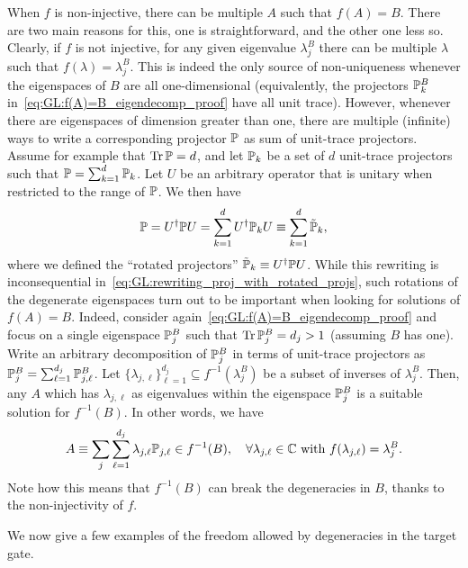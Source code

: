 When $f$ is non-injective, there can be multiple $A$ such that $f(A)=B$. There are two main reasons for this, one is straightforward, and the other one less so.
Clearly, if $f$ is not injective, for any given eigenvalue $\lambda_j^B$ there can be multiple $\lambda$ such that $f(\lambda)=\lambda_j^B$. This is indeed the only source of non-uniqueness whenever the eigenspaces of $B$ are all one-dimensional (equivalently, the projectors ${\mathbb{P}}_k^B$ in~\cref{eq:GL:f(A)=B_eigendecomp_proof} have all unit trace).
However, whenever there are eigenspaces of dimension greater than one, there are multiple (infinite) ways to write a corresponding projector ${\mathbb{P}}$ as sum of unit-trace projectors. Assume for example that $\Tr\PP=d$, and let ${\mathbb{P}}_k$ be a set of $d$ unit-trace projectors such that ${\mathbb{P}}=\sum_{k=1}^d {\mathbb{P}}_k$. Let $U$ be an arbitrary operator that is unitary when restricted to the range of ${\mathbb{P}}$.
We then have
\begin{equation}
    {\mathbb{P}}=U^\dagger {\mathbb{P}} U =\sum_{k=1}^d U^\dagger {\mathbb{P}}_k U
    \equiv \sum_{k=1}^d \tilde{{\mathbb{P}}}_k,
    \label{eq:GL:rewriting_proj_with_rotated_projs}
\end{equation}
where we defined the ``rotated projectors'' $\tilde{{\mathbb{P}}}_k\equiv U^\dagger {\mathbb{P}} U$.
While this rewriting is inconsequential in~\cref{eq:GL:rewriting_proj_with_rotated_projs}, such rotations of the degenerate eigenspaces turn out to be important when looking for solutions of $f(A)=B$.
Indeed, consider again~\cref{eq:GL:f(A)=B_eigendecomp_proof} and focus on a single eigenspace ${\mathbb{P}}_j^B$ such that $\Tr\PP_j^B=d_j>1$ (assuming $B$ has one). Write an arbitrary decomposition of ${\mathbb{P}}_j^B$ in terms of unit-trace projectors as ${\mathbb{P}}_j^B=\sum_{\ell=1}^{d_j}{\mathbb{P}}^B_{j,\ell}$.
Let $\{\lambda_{j,\ell}\}_{\ell=1}^{d_j}\subseteq f^{-1}(\lambda_j^B)$ be a subset of inverses of $\lambda_j^B$. Then, any $A$ which has $\lambda_{j,\ell}$ as eigenvalues within the eigenspace ${\mathbb{P}}_j^B$ is a suitable solution for $f^{-1}(B)$.
In other words, we have
\begin{equation}
    A \equiv \sum_j \sum_{\ell=1}^{d_j} \lambda_{j,\ell} {\mathbb{P}}_{j,\ell}\in f^{-1}(B),
    \quad \forall \lambda_{j,\ell}\in{\mathbb{C}} \text{ with } f(\lambda_{j,\ell})=\lambda_j^B.
    \label{eq:GL:general_form_f-1B}
\end{equation}
Note how this means that $f^{-1}(B)$ can break the degeneracies in $B$, thanks to the non-injectivity of $f$.

We now give a few examples of the freedom allowed by degeneracies in the target gate.

